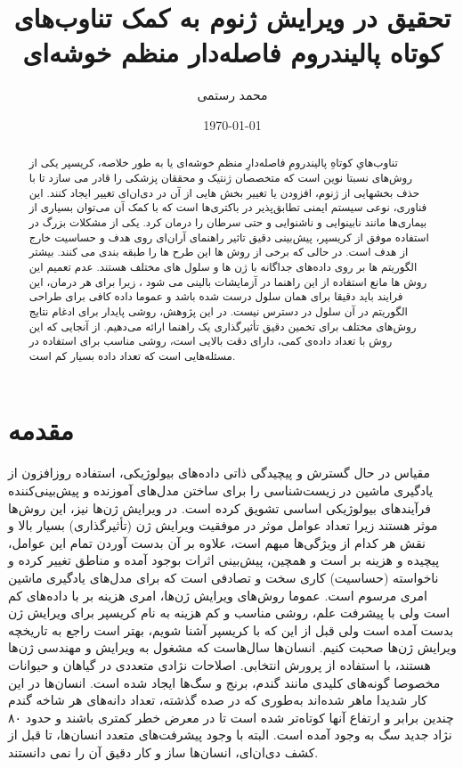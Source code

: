 \documentclass[12pt,a4paper,BCOR=.7cm,headsepline,bibliography=totoc]{report}
\title{تحقیق در ویرایش ژنوم به کمک تناوب‌های کوتاه پالیندروم فاصله‌دار منظم خوشه‌ای}
\author{محمد رستمی }
\date{\today}
\begin{document}
\makethesistitle
{}
\begin{abstract}
تناوب‌هایِ کوتاهِ پالیندرومِ فاصله‌دارِ منظمِ خوشه‌ای یا به طور خلاصه، کریسپر  یکی از روش‌های نسبتا نوین است که متخصصان ژنتیک و محققان پزشکی را قادر می سازد تا با حذف بخشهایی از ژنوم،
افزودن یا تغییر بخش هایی از آن در دی‌ان‌ای  تغییر ایجاد کنند. این فناوری، نوعی سیستم ایمنی تطابق‌پذیر در باکتری‌ها است که با کمک آن می‌توان بسیاری از بیماری‌ها مانند نابینوایی و ناشنوایی و حتی سرطان را درمان کرد. یکی از مشکلات بزرگ در استفاده موفق از کریسپر، پیش‌بینی دقیق تاثیر راهنمای آر‌ان‌ای  روی هدف و حساسیت خارج از هدف است. در حالی که برخی از روش ها این طرح ها را طبقه بندی می کنند. بیشتر
الگوریتم ها بر روی داده‌های جداگانه با ژن ها و سلول های مختلف هستند. عدم تعمیم این روش ها
مانع استفاده از این راهنما در آزمایشات بالینی می شود ، زیرا برای هر درمان، این فرایند باید دقیقا برای همان سلول درست شده باشد و عموما داده کافی برای طراحی الگوریتم در آن سلول در دسترس نیست. در این پژوهش، روشی پایدار برای ادغام نتایج روش‌های مختلف برای تخمین دقیق تأثیرگذاری یک راهنما ارائه می‌دهیم. از آنجایی که این روش با تعداد داده‌ی کمی، دارای دقت بالایی است، روشی مناسب برای استفاده در مسئله‌هایی است که تعداد داده بسیار کم است.
\end{abstract}
\pagestyle{plain}

\tableofcontents{} \listoffigures{}
\chapter{مقدمه}
\pagestyle{fancy} 
مقیاس در حال گسترش و پیچیدگی ذاتی داده‌های بیولوژیکی، استفاده روزافزون از یادگیری ماشین در زیست‌شناسی را برای ساختن مدل‌های آموزنده و پیش‌بینی‌کننده فرآیندهای بیولوژیکی اساسی تشویق کرده است. در ویرایش ژن‌ها نیز، این روش‌ها موثر هستند زیرا تعداد عوامل موثر در موفقیت ویرایش ژن (تأثیرگذاری) بسیار بالا و نقش هر کدام از ویژگی‌ها مبهم است، علاوه بر آن بدست آوردن تمام این عوامل، پیچیده و هزینه بر است و همچین، پیش‌بینی اثرات بوجود آمده و مناطق تغییر کرده و ناخواسته (حساسیت) کاری سخت و تصادفی است که برای مدل‌های یادگیری ماشین امری مرسوم است. عموما روش‌های ویرایش ژن‌ها، امری هزینه بر با داده‌های کم است ولی با پیشرفت علم، روشی مناسب و کم هزینه به نام کریسپر برای ویرایش ژن بدست آمده است ولی قبل از این که با کریسپر آشنا شویم، بهتر است راجع به تاریخچه ویرایش ژن‌ها صحبت کنیم. انسان‌ها سال‌هاست که مشغول به ویرایش و مهندسی ژن‌ها هستند، با استفاده از پرورش انتخابی.
	اصلاحات نژادی متعددی در گیاهان و حیوانات مخصوصا گونه‌های کلیدی مانند گندم، برنج و سگ‌ها ایجاد شده است. انسان‌ها در این کار شدیدا ماهر شده‌اند به‌طوری که در صده گذشته، تعداد دانه‌های هر شاخه گندم چندین برابر و ارتفاع آنها کوتاه‌تر شده است تا در معرض خطر کمتری باشند و حدود ۸۰ نژاد جدید سگ به وجود آمده است. البته با وجود پیشرفت‌های متعدد انسان‌ها، تا قبل از کشف دی‌ان‌ای، انسان‌ها ساز و کار دقیق آن را نمی دانستند. 
\end{document}
